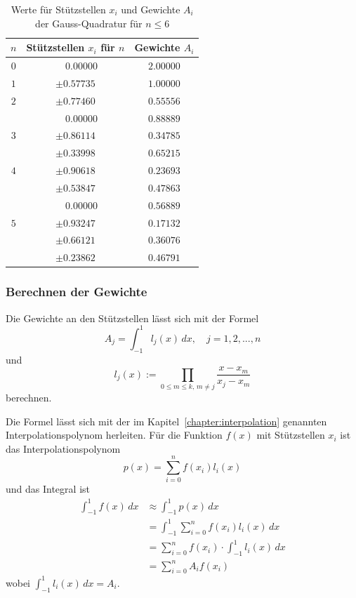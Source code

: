 \begin{table}
    \centering
    \begin{tabular}{|c|c|c|}
        \hline
        $n$ & Stützstellen $x_{i}$ für $n$ & Gewichte $A_{i}$\\
        \hline
        $0$ & $ \phantom{-} 0.00000 $ & $ 2.00000 $ \\
        \hline
        $1$ & $ \pm 0.57735 $ & $ 1.00000 $ \\
        \hline
        $2$ & $ \pm 0.77460 $ & $ 0.55556 $ \\
            & $ \phantom{-} 0.00000 $ & $ 0.88889 $ \\
        \hline
        $3$ & $ \pm 0.86114 $ & $ 0.34785 $ \\
            & $ \pm 0.33998 $ & $ 0.65215 $ \\
        \hline
        $4$ & $ \pm 0.90618 $ & $ 0.23693 $ \\
            & $ \pm 0.53847 $ & $ 0.47863 $ \\
            & $ \phantom{-} 0.00000 $ & $ 0.56889 $ \\
        \hline
        $5$ & $ \pm 0.93247 $ & $ 0.17132 $ \\
            & $ \pm 0.66121 $ & $ 0.36076 $ \\
            & $ \pm 0.23862 $ & $ 0.46791 $ \\
        \hline
    \end{tabular}
    \caption{Werte für Stützstellen $x_{i}$ und Gewichte $A_{i}$ der Gauss-Quadratur für $n \leq 6$
    \label{buch:table:gaussgewichtwerte}}    
\end{table}

\subsubsection{Berechnen der Gewichte}
Die Gewichte an den Stützstellen lässt sich mit der Formel
\begin{equation*}
    A_{j} = \int_{-1}^{1} l_j(x) \, dx, \quad  j = 1, 2, ... , n
\end{equation*}
und 
\begin{equation}
    l_{j}(x) := \prod_{0 \leq m \leq k, \, m \neq j} \frac{x - x_{m}}{x_{j} - x_{m}}
\end{equation}
berechnen.

Die Formel lässt sich mit der im Kapitel~\ref{chapter:interpolation} genannten 
Interpolationspolynom herleiten.
Für die Funktion $f(x)$ mit Stützstellen $x_{i}$ ist das Interpolationspolynom
\begin{equation}
    p(x) = \sum_{i=0}^{n} f(x_{i})l_{i}(x)
\end{equation}
und das Integral ist 
\begin{align}
    \int_{-1}^{1}f(x)\,dx &\approx \int_{-1}^{1}p(x)\,dx \\
    &= \int_{-1}^{1} \sum_{i=0}^{n} f(x_{i}) l_{i}(x) \,dx \\
    &= \sum_{i=0}^{n} f(x_{i}) \cdot \int_{-1}^{1}  l_{i}(x) \,dx \\
    &= \sum_{i=0}^{n} A_{i} f(x_{i})
\end{align}
wobei $\int_{-1}^{1}  l_{i}(x) \,dx = A_{i}$.

